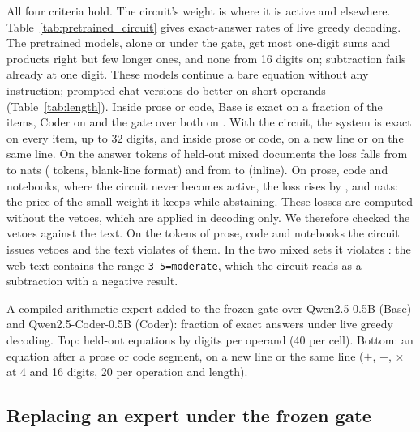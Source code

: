 \documentclass[10pt]{article}
\newcommand{\pending}[1]{{\color{red}\textbf{[#1]}}}
\begin{document}
All four criteria hold. The circuit's weight is \resTrackBCircLamOn{} where it is active and
\resTrackBCircLamOff{} elsewhere. Table~\ref{tab:pretrained_circuit} gives exact-answer rates
of live greedy decoding. The pretrained models, alone or under the gate, get most one-digit sums
and products right but few longer ones, and none from 16 digits on; subtraction fails already
at one digit. These models continue a bare equation without any instruction; prompted chat
versions do better on short operands (Table~\ref{tab:length}). Inside prose or code, Base is exact on a fraction \resTrackBCircInTextBase{} of
the items, Coder on \resTrackBCircInTextCoder{} and the gate over both on
\resTrackBCircInTextGate{}. With the circuit, the system is exact on every item, up to 32 digits, and inside prose
or code, on a new line or on the same line. On the answer tokens of held-out mixed documents
the loss falls from \resTrackBCircActGateBlank{} to \resTrackBCircActCircBlank{} nats
(\resTrackBCircActiveBlank{} tokens, blank-line format) and from \resTrackBCircActGateInline{}
to \resTrackBCircActCircInline{} (inline). On prose, code and notebooks, where the circuit
never becomes active, the loss rises by \resTrackBCircCostProse{}, \resTrackBCircCostCode{} and
\resTrackBCircCostNotebook{} nats: the price of the small weight it keeps while abstaining.
These losses are computed without the vetoes, which are applied in decoding only. We therefore
checked the vetoes against the text. On the \resTrackBVetoScanTokens{} tokens of prose, code and
notebooks the circuit issues \resTrackBVetoScanRespected{} vetoes and the text violates
\resTrackBVetoScanViolated{} of them. In the two mixed sets it violates
\resTrackBVetoMixedViolated{}: the web text contains the range \texttt{3-5=moderate}, which the
circuit reads as a subtraction with a negative result.
\begin{table}[t]
\centering\small
\caption{A compiled arithmetic expert added to the frozen gate over Qwen2.5-0.5B (Base) and
Qwen2.5-Coder-0.5B (Coder): fraction of exact answers under live greedy decoding. Top: held-out
equations by digits per operand (40 per cell). Bottom: an equation after a prose or code
segment, on a new line or the same line ($+$, $-$, $\times$ at 4 and 16 digits, 20 per
operation and length).}
\label{tab:pretrained_circuit}
{\setlength{\tabcolsep}{4pt}\IfFileExists{tables/track_b_circuit.tex}{}{\pending{table}}}
\end{table}

\subsection{Replacing an expert under the frozen gate}
\label{sec:pretrained_swap}
\end{document}
